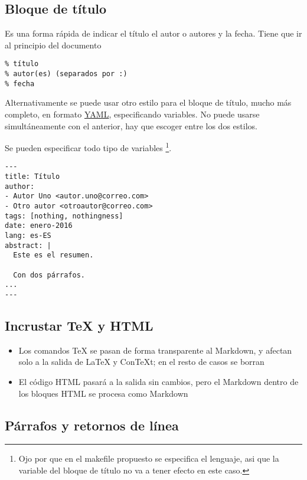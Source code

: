 \documentclass[12pt,spanish,]{article}
\providecommand{\tightlist}{%
  \setlength{\itemsep}{0pt}\setlength{\parskip}{0pt}}
\begin{document}
\hypertarget{bloque-de-tuxedtulo}{%
\subsection{Bloque de título}\label{bloque-de-tuxedtulo}}

Es una forma rápida de indicar el título el autor o autores y la fecha.
Tiene que ir al principio del documento

\begin{verbatim}
% título
% autor(es) (separados por :)
% fecha
\end{verbatim}

Alternativamente se puede usar otro estilo para el bloque de título,
mucho más completo, en formato
\href{https://en.wikipedia.org/wiki/YAML}{YAML}, especificando
variables. No puede usarse simultáneamente con el anterior, hay que
escoger entre los dos estilos.

Se pueden especificar todo tipo de variables \footnote{Ojo por que en el
  makefile propuesto se especifica el lenguaje, asi que la variable del
  bloque de título no va a tener efecto en este caso.}.

\begin{verbatim}
---
title: Título
author:
- Autor Uno <autor.uno@correo.com>
- Otro autor <otroautor@correo.com>
tags: [nothing, nothingness]
date: enero-2016
lang: es-ES
abstract: |
  Este es el resumen.

  Con dos párrafos.
...
---
\end{verbatim}

\hypertarget{incrustar-tex-y-html}{%
\subsection{Incrustar TeX y HTML}\label{incrustar-tex-y-html}}

\begin{itemize}
\tightlist
\item
  Los comandos TeX se pasan de forma transparente al Markdown, y afectan
  solo a la salida de LaTeX y ConTeXt; en el resto de casos se borran
\item
  El código HTML pasará a la salida sin cambios, pero el Markdown dentro
  de los bloques HTML se procesa como Markdown
\end{itemize}

\hypertarget{puxe1rrafos-y-retornos-de-luxednea}{%
\subsection{Párrafos y retornos de
línea}\label{puxe1rrafos-y-retornos-de-luxednea}}
\end{document}
